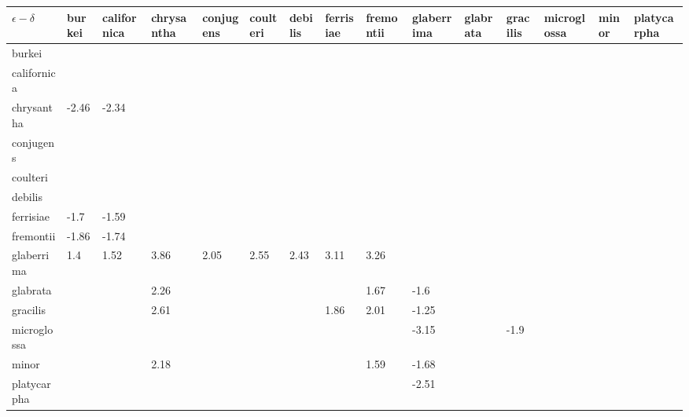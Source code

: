 \begin{table}[ht]
\centering
\begingroup\fontsize{5pt}{5pt}\selectfont
\begin{tabular}{lllllllllllllll}
  \hline
$\epsilon - \delta$ & burkei & californica & chrysantha & conjugens & coulteri & debilis & ferrisiae & fremontii & glaberrima & glabrata & gracilis & microglossa & minor & platycarpha \\ 
  \hline
burkei &  &  &  &  &  &  &  &  &  &  &  &  &  &  \\ 
  californica &  &  &  &  &  &  &  &  &  &  &  &  &  &  \\ 
  chrysantha & -2.46 & -2.34 &  &  &  &  &  &  &  &  &  &  &  &  \\ 
  conjugens &  &  &  &  &  &  &  &  &  &  &  &  &  &  \\ 
  coulteri &  &  &  &  &  &  &  &  &  &  &  &  &  &  \\ 
  debilis &  &  &  &  &  &  &  &  &  &  &  &  &  &  \\ 
  ferrisiae & -1.7 & -1.59 &  &  &  &  &  &  &  &  &  &  &  &  \\ 
  fremontii & -1.86 & -1.74 &  &  &  &  &  &  &  &  &  &  &  &  \\ 
  glaberrima & 1.4 & 1.52 & 3.86 & 2.05 & 2.55 & 2.43 & 3.11 & 3.26 &  &  &  &  &  &  \\ 
  glabrata &  &  & 2.26 &  &  &  &  & 1.67 & -1.6 &  &  &  &  &  \\ 
  gracilis &  &  & 2.61 &  &  &  & 1.86 & 2.01 & -1.25 &  &  &  &  &  \\ 
  microglossa &  &  &  &  &  &  &  &  & -3.15 &  & -1.9 &  &  &  \\ 
  minor &  &  & 2.18 &  &  &  &  & 1.59 & -1.68 &  &  &  &  &  \\ 
  platycarpha &  &  &  &  &  &  &  &  & -2.51 &  &  &  &  &  \\ 
   \hline
\end{tabular}
\endgroup
\end{table}

